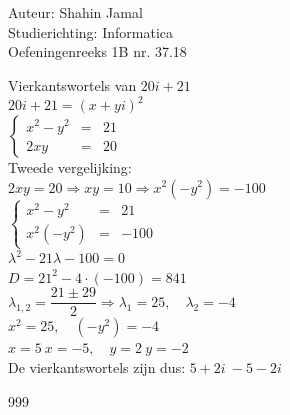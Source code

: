 \documentclass[a4paper]{article}
\begin{document}
  
\noindent \large Auteur: Shahin Jamal \\
\noindent \large Studierichting: Informatica\\
\noindent \large Oefeningenreeks 1B nr. 37.18\\

\medskip

\normalsize

Vierkantswortels van $20i + 21$\\

$20i + 21 = (x + yi)^2$\\

$\left\{\begin{array}{rcl}
    x^2 - y^2 & = & 21 \\
    2xy & = & 20
\end{array}\right.$\\

Tweede vergelijking:\\

$2xy = 20 \Rightarrow xy = 10 \Rightarrow x^2(-y^2) = -100$\\

$\left
\{\begin{array}{rcl}
    x^2 - y^2 & = & 21 \\
    x^2(-y^2) & = & -100
\end{array}
\right. $\\

$\lambda^2 - 21\lambda - 100 = 0$\\

$D = 21^2 - 4 \cdot (-100) = 841$\\

$\lambda_{1,2} = \dfrac{21 \pm 29}{2} \Rightarrow \lambda_{1} = 25, \quad \lambda_{2} = -4$\\

$x^2 = 25, \quad (-y^2) = -4$\\

$x = 5 \ x = -5, \quad y = 2 \ y = -2$\\

De vierkantswortels zijn dus: $5 + 2i \ -5 - 2i$

\begin{thebibliography}{999}
\end{thebibliography}
\end{document}

